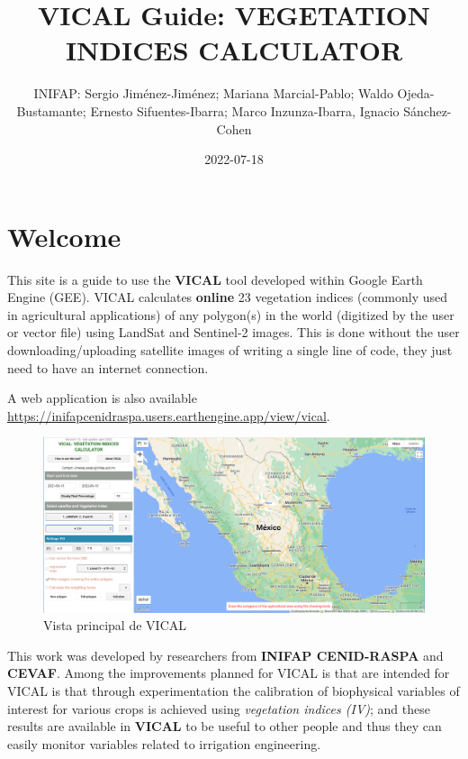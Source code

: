 \documentclass[
]{book}
\title{VICAL Guide: VEGETATION INDICES CALCULATOR}
\author{INIFAP: Sergio Jiménez-Jiménez; Mariana Marcial-Pablo; Waldo Ojeda-Bustamante; Ernesto Sifuentes-Ibarra; Marco Inzunza-Ibarra, Ignacio Sánchez-Cohen}
\date{2022-07-18}
\begin{document}
\maketitle

{
\setcounter{tocdepth}{1}
\tableofcontents
}
\hypertarget{welcome}{%
\chapter*{Welcome}\label{welcome}}

This site is a guide to use the \textbf{VICAL} tool developed within Google Earth Engine (GEE). VICAL calculates \textbf{online} 23 vegetation indices (commonly used in agricultural applications) of any polygon(s) in the world (digitized by the user or vector file) using LandSat and Sentinel-2 images. This is done without the user downloading/uploading satellite images of writing a single line of code, they just need to have an internet connection.

A web application is also available \url{https://inifapcenidraspa.users.earthengine.app/view/vical}.

\begin{figure}

{\centering \includegraphics[width=0.9\linewidth]{./images/Captura2} 

}

\caption{Vista principal de VICAL}\label{fig:fig2}
\end{figure}

This work was developed by researchers from \textbf{INIFAP CENID-RASPA} and \textbf{CEVAF}. Among the improvements planned for VICAL is that are intended for VICAL is that through experimentation the calibration of biophysical variables of interest for various crops is achieved using \emph{vegetation indices (IV)}; and these results are available in \textbf{VICAL} to be useful to other people and thus they can easily monitor variables related to irrigation engineering.
\end{document}
